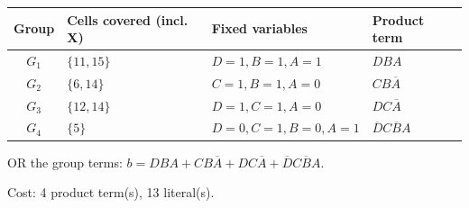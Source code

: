 \documentclass[a4paper,11pt]{article}
\begin{document}
\begin{minipage}{\textwidth}
\begin{center}\small
\begin{tabular}{clll}
\toprule
Group & Cells covered (incl. X) & Fixed variables & Product term\\\midrule
\textcolor{blue!75!black}{$G_{1}$} & $\{11,15\}$ & $D=1,B=1,A=1$ & $DBA$\\
\textcolor{red!75!black}{$G_{2}$} & $\{6,14\}$ & $C=1,B=1,A=0$ & $CB\overline{A}$\\
\textcolor{teal!80!black}{$G_{3}$} & $\{12,14\}$ & $D=1,C=1,A=0$ & $DC\overline{A}$\\
\textcolor{violet!85!black}{$G_{4}$} & $\{5\}$ & $D=0,C=1,B=0,A=1$ & $\overline{D}C\overline{B}A$\\
\bottomrule\end{tabular}\end{center}


\noindent OR the group terms: $\boxed{b=DBA + CB\overline{A} + DC\overline{A} + \overline{D}C\overline{B}A}$.

\noindent Cost: 4 product term(s), 13 literal(s).

\end{minipage}\par\vspace{0.25cm}

\clearpage
\end{document}
